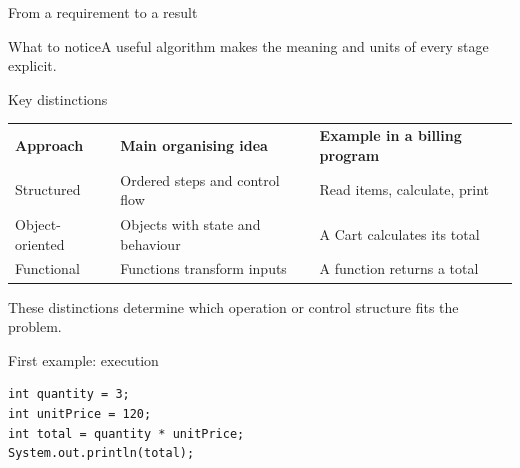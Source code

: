 \documentclass[10pt,aspectratio=169]{beamer}
\begin{document}
\begin{frame}[fragile,t]{From a requirement to a result}
\begin{center}\end{center}
\begin{block}{What to notice}A useful algorithm makes the meaning and units of every stage explicit.\end{block}
\end{frame}
\begin{frame}[fragile,t]{Key distinctions}
\small\renewcommand{\arraystretch}{1.5}
\begin{tabularx}{\textwidth}{>{\raggedright\arraybackslash}X>{\raggedright\arraybackslash}X>{\raggedright\arraybackslash}X}
\rowcolor{navy}
\color{white}\bfseries Approach & \color{white}\bfseries Main organising idea & \color{white}\bfseries Example in a billing program\\
Structured & Ordered steps and control flow & Read items, calculate, print\\
Object-oriented & Objects with state and behaviour & A Cart calculates its total\\
Functional & Functions transform inputs & A function returns a total\\
\end{tabularx}
\vspace{3mm}\footnotesize These distinctions determine which operation or control structure fits the problem.
\end{frame}

\begin{frame}[fragile,t]{First example: execution}
\begin{lstlisting}
int quantity = 3;
int unitPrice = 120;
int total = quantity * unitPrice;
System.out.println(total);
\end{lstlisting}
\end{frame}
\end{document}
